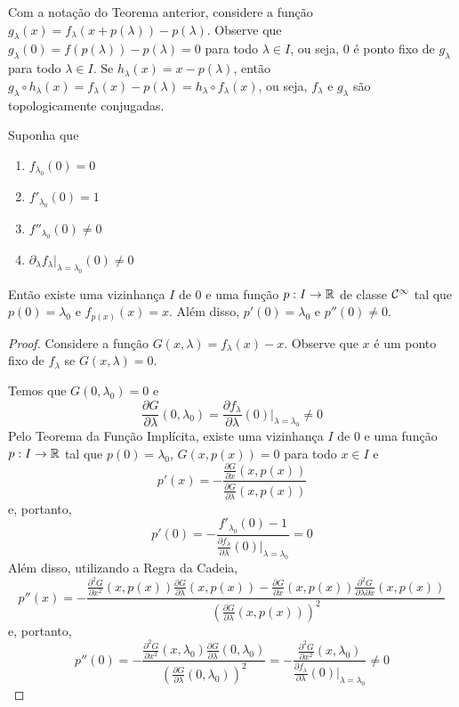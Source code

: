 Com a notação do Teorema anterior, considere a função $g_\lambda(x) = f_\lambda(x + p(\lambda)) - p(\lambda)$. Observe que $g_\lambda(0) = f(p(\lambda)) - p(\lambda) = 0$ para todo $\lambda \in I$, ou seja, $0$ é ponto fixo de $g_\lambda$ para todo $\lambda \in I$. Se $h_\lambda(x) = x - p(\lambda)$, então $g_\lambda \circ h_\lambda(x) = f_\lambda(x) - p(\lambda) = h_\lambda \circ f_\lambda(x)$, ou seja, $f_\lambda$ e $g_\lambda$ são topologicamente conjugadas.

\begin{theorem}
Suponha que
\begin{enumerate}
\item $f_{\lambda_0}(0) = 0$
\item $f'_{\lambda_0}(0) = 1$
\item $f''_{\lambda_0}(0) \neq 0$
\item $\partial_\lambda f_\lambda |_{\lambda = \lambda_0}(0) \neq 0$
\end{enumerate}
Então existe uma vizinhança $I$ de $0$ e uma função $p: I \to \mathbb{R}$ de classe $\mathcal{C}^\infty$ tal que $p(0) = \lambda_0$ e $f_{p(x)}(x) = x$. Além disso, $p'(0) = \lambda_0$ e $p''(0) \neq 0$.
\end{theorem}

\begin{proof}
Considere a função $G(x, \lambda) = f_\lambda(x) - x$. Observe que $x$ é um ponto fixo de $f_\lambda$ se $G(x, \lambda) = 0$.

Temos que $G(0, \lambda_0) = 0$ e 
$$\frac{\partial G}{\partial \lambda}(0, \lambda_0) = \frac{\partial f_\lambda}{\partial \lambda}(0)|_{\lambda = \lambda_0} \neq 0$$
Pelo Teorema da Função Implícita, existe uma vizinhança $I$ de $0$ e uma função $p: I \to \mathbb{R}$ tal que $p(0) = \lambda_0$, $G(x, p(x)) = 0$ para todo $x \in I$ e
$$p'(x) = - \frac{\frac{\partial G}{\partial x}(x, p(x))}
{\frac{\partial G}{\partial \lambda}(x, p(x))}$$
e, portanto,
$$p'(0) = - \frac{f'_{\lambda_0}(0) - 1}{\frac{\partial f_\lambda}{\partial \lambda}(0)|_{\lambda = \lambda_0}} = 0$$
Além disso, utilizando a Regra da Cadeia,
$$p''(x) = - \frac{\frac{\partial^2 G}{\partial x^2}(x, p(x))\frac{\partial G}{\partial \lambda}(x, p(x)) - \frac{\partial G}{\partial x}(x, p(x)) \frac{\partial^2 G}{\partial \lambda \partial x}(x, p(x))}
{\left( \frac{\partial G}{\partial \lambda}(x, p(x)) \right)^2}$$
e, portanto,
$$p''(0) = - \frac{\frac{\partial^2 G}{\partial x^2}(x, \lambda_0) \frac{\partial G}{\partial \lambda}(0, \lambda_0)}{\left( \frac{\partial G}{\partial \lambda}(0, \lambda_0) \right)^2} = - \frac{\frac{\partial^2 G}{\partial x^2}(x, \lambda_0)}{ \frac{\partial f_\lambda}{\partial \lambda}(0)|_{\lambda = \lambda_0}} \neq 0$$
\end{proof}

